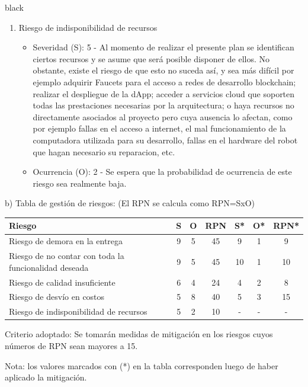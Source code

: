\documentclass[
11pt, %
]{charter}
\begin{document}
\begin{consigna}{black}
\begin{enumerate}
\item Riesgo de indisponibilidad de recursos
\begin{itemize}
	\item Severidad (S): 5 - Al momento de realizar el presente plan se identifican ciertos recursos y se asume que será posible disponer de ellos. No obstante, existe el riesgo de que esto no suceda así, y sea más difícil por ejemplo adquirir Faucets para el acceso a redes de desarrollo blockchain; realizar el despliegue de la dApp; acceder a servicios cloud que soporten todas las prestaciones necesarias por la arquitectura; o haya recursos no directamente asociados al proyecto pero cuya ausencia lo afectan, como por ejemplo fallas en el acceso a internet, el mal funcionamiento de la computadora utilizada para su desarrollo, fallas en el hardware del robot que hagan necesario su reparacion, etc.
	\item Ocurrencia (O): 2 - Se espera que la probabilidad de ocurrencia de este riesgo sea realmente baja.
\end{itemize}

\end{enumerate}

b) Tabla de gestión de riesgos:      (El RPN se calcula como RPN=SxO)

\begin{table}[htpb]
\centering
\begin{tabularx}{\linewidth}{@{}|X|c|c|c|c|c|c|@{}}
\hline
\rowcolor[HTML]{C0C0C0}
Riesgo 													& S & O & RPN & S* & O* & RPN* \\ \hline
Riesgo de demora en la entrega							& 9 & 5 & 45 &	9  &  1  & 9    \\ \hline
Riesgo de no contar con toda la funcionalidad deseada		& 9 & 5 & 45 & 	10  & 1 &  10    \\ \hline
Riesgo de calidad insuficiente							& 6 & 4 & 24 &  	4 &  2 &   8  \\ \hline
Riesgo de desvío en costos								& 5 & 8 & 40 & 	5  & 3  &  15   \\ \hline
Riesgo de indisponibilidad de recursos					& 5 & 2 & 10 & 	-  & -  &   -   \\ \hline
\end{tabularx}%
\end{table}

Criterio adoptado:
Se tomarán medidas de mitigación en los riesgos cuyos números de RPN sean mayores a 15.

Nota: los valores marcados con (*) en la tabla corresponden luego de haber aplicado la mitigación.


\end{consigna}
\end{document}
